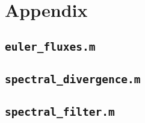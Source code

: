 \documentclass[10pt]{article}
\begin{document}
\begin{comment}
\begin{figure}[H]
\centering
\texttt{[image: figures/question2c.png]}
\caption{Infinity norm as a function of iteration number for various refinement levels}
\label{fig:question2c}
\end{figure}
\end{comment}








\section{Appendix}
\subsection{{\tt euler\_fluxes.m}}

\subsection{{\tt spectral\_divergence.m}}

\subsection{{\tt spectral\_filter.m}}

\end{document}
